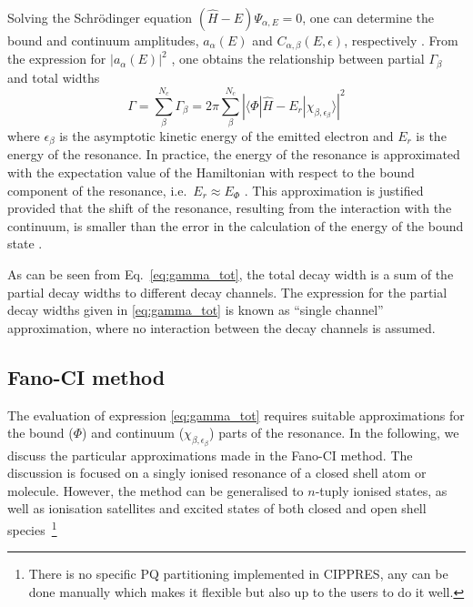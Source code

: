 \documentclass[a4paper, 10 pt]{report}
\newcommand{\dirint}[3]{\ensuremath{\langle #1|#2|#3\rangle}}
\begin{document}
Solving the Schr\"{o}dinger equation $(\hat{H} - E)\Psi_{\alpha, E} = 0$, one 
can determine the bound and continuum amplitudes, $a_{\alpha} (E)$ and 
$C_{\alpha, \beta} (E, \epsilon)$, respectively \cite{Fano61:1866,Howat78:1575}. From 
the expression for $|a_{\alpha}(E)|^2$ \cite{Howat78:1575}, one obtains the 
relationship between partial $\Gamma_{\beta}$ and total widths
%
\begin{equation}\label{eq:gamma_tot}
\Gamma = \sum_{\beta}^{N_{c}} \Gamma_{\beta} 
= 2\pi \sum_{\beta}^{N_{c}} |\dirint{\Phi}{\hat{H} - E_{r}}{\chi_{\beta, \epsilon_{\beta}}}|^{2}
\end{equation}
%
where $\epsilon_{\beta}$ is the asymptotic kinetic energy of the emitted 
electron and $E_{r}$ is the energy of the resonance. In practice, the energy of 
the resonance is approximated with the expectation value of the Hamiltonian with 
respect to the bound component of the resonance, i.e.~$E_{r} \approx E_{\Phi}$
\cite{Averbukh05:204107}. This approximation is justified provided that the 
shift of the resonance, resulting from the interaction with the continuum, is 
smaller than the error in the calculation of the energy of the bound state 
\cite{Averbukh05:204107}.


As can be seen from Eq.~\eqref{eq:gamma_tot}, the total decay width is a sum of 
the partial decay widths to different decay channels. The expression for the 
partial decay widths given in \eqref{eq:gamma_tot} is known as ``single 
channel'' approximation, where no interaction between the decay channels is 
assumed. 


\subsection{Fano-CI method}\label{ssec:fanoci}

The evaluation of expression \eqref{eq:gamma_tot} requires suitable 
approximations for the bound ($\Phi$) and continuum ($\chi_{\beta, \epsilon_
	{\beta}}$) parts of the resonance. In the following, we discuss the particular 
approximations made in the Fano-CI method. The discussion is focused on a singly 
ionised resonance of a closed shell atom or molecule. However, the method can be 
generalised to $n$-tuply ionised states, as well as ionisation satellites and 
excited states of both closed and open shell species~\footnote{There is no specific PQ partitioning implemented in CIPPRES, any can be done manually which makes it flexible but also up to the users to do it well.} 
\end{document}
